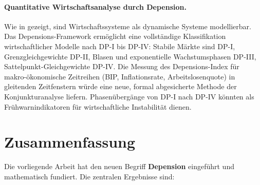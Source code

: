 ﻿\documentclass[12pt, a4paper]{article}
\theoremstyle{definition}
\theoremstyle{remark}
\begin{document}
\paragraph{Quantitative Wirtschaftsanalyse durch Depension.}
Wie in \citet{epp2026sysstate} gezeigt, sind Wirtschaftssysteme als dynamische
Systeme modellierbar. Das Depensions-Framework ermöglicht eine vollständige
Klassifikation wirtschaftlicher Modelle nach DP-I bis DP-IV: Stabile Märkte sind
DP-I, Grenzgleichgewichte DP-II, Blasen und exponentielle Wachstumsphasen DP-III,
Sattelpunkt-Gleichgewichte DP-IV. Die Messung des Depensions-Index für makro-ökonomische
Zeitreihen (BIP, Inflationsrate, Arbeitslosenquote) in gleitenden Zeitfenstern würde
eine neue, formal abgesicherte Methode der Konjunkturanalyse liefern. Phasenübergänge
von DP-I nach DP-IV könnten als Frühwarnindikatoren für wirtschaftliche Instabilität
dienen.

\section{Zusammenfassung}
\label{sec:zusammenfassung}

Die vorliegende Arbeit hat den neuen Begriff \textbf{Depension} eingeführt und
mathematisch fundiert. Die zentralen Ergebnisse sind:
\end{document}
